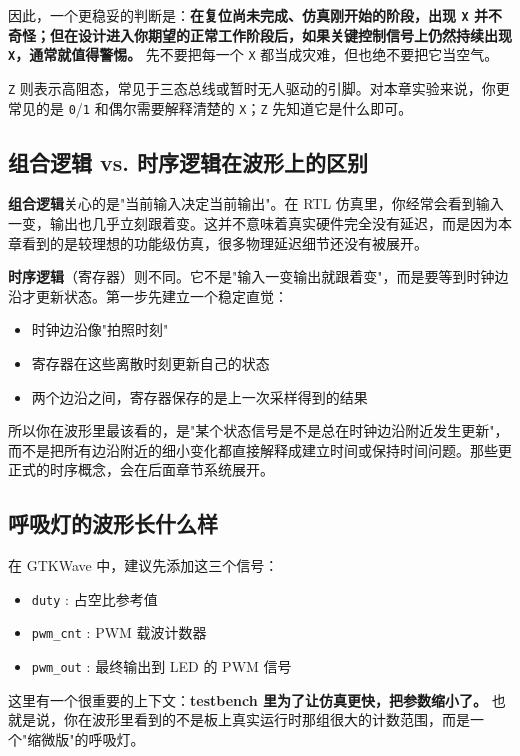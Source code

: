 \documentclass[11pt,a4paper]{article}
\begin{document}
因此，一个更稳妥的判断是：\textbf{在复位尚未完成、仿真刚开始的阶段，出现 \texttt{X} 并不奇怪；但在设计进入你期望的正常工作阶段后，如果关键控制信号上仍然持续出现 \texttt{X}，通常就值得警惕。} 先不要把每一个 \texttt{X} 都当成灾难，但也绝不要把它当空气。

\texttt{Z} 则表示高阻态，常见于三态总线或暂时无人驱动的引脚。对本章实验来说，你更常见的是 \texttt{0}/\texttt{1} 和偶尔需要解释清楚的 \texttt{X}；\texttt{Z} 先知道它是什么即可。

\subsection{组合逻辑 vs. 时序逻辑在波形上的区别}

\textbf{组合逻辑}关心的是"当前输入决定当前输出"。在 RTL 仿真里，你经常会看到输入一变，输出也几乎立刻跟着变。这并不意味着真实硬件完全没有延迟，而是因为本章看到的是较理想的功能级仿真，很多物理延迟细节还没有被展开。

\textbf{时序逻辑}（寄存器）则不同。它不是"输入一变输出就跟着变"，而是要等到时钟边沿才更新状态。第一步先建立一个稳定直觉：

\begin{itemize}
  \item 时钟边沿像"拍照时刻"
  \item 寄存器在这些离散时刻更新自己的状态
  \item 两个边沿之间，寄存器保存的是上一次采样得到的结果
\end{itemize}

所以你在波形里最该看的，是"某个状态信号是不是总在时钟边沿附近发生更新"，而不是把所有边沿附近的细小变化都直接解释成建立时间或保持时间问题。那些更正式的时序概念，会在后面章节系统展开。

\subsection{呼吸灯的波形长什么样}

在 GTKWave 中，建议先添加这三个信号：
\begin{itemize}
  \item \texttt{duty} : 占空比参考值
  \item \texttt{pwm\_cnt} : PWM 载波计数器
  \item \texttt{pwm\_out} : 最终输出到 LED 的 PWM 信号
\end{itemize}

这里有一个很重要的上下文：\textbf{testbench 里为了让仿真更快，把参数缩小了。} 也就是说，你在波形里看到的不是板上真实运行时那组很大的计数范围，而是一个"缩微版"的呼吸灯。
\end{document}
